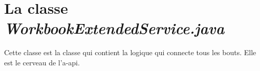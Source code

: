 \chapter{La classe \textit{WorkbookExtendedService.java}}
\label{ch:workbook-service-code}

Cette classe est la classe qui contient la logique qui connecte tous les bouts.
Elle est le cerveau de l'\gls{a-api}.


